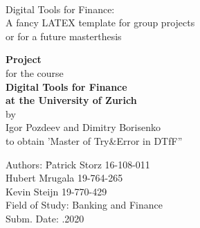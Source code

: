 \documentclass[12pt,a4paper]{article}
\begin{document}
\thispagestyle{empty}
\ \vspace{1.0cm}
\begin{center}
{\LARGE
Digital Tools for Finance: \\[0.1cm]
A fancy LATEX template for group projects\\[0.1cm]
or for a future masterthesis \\[1cm]
}

{
{\bf Project} \\
for the course \\[0.5cm]
{\bf Digital Tools for Finance } \\
{\bf at the University of Zurich} \\[0.5cm]
by\\
Igor Pozdeev and Dimitry Borisenko\\
to obtain 'Master of Try\&Error in DTfF'' \\[2.5cm]
}


\hspace{1cm}\begin{minipage}[h]{12cm}
\begin{tabbing}
Authors: \hspace{1cm} \= Patrick Storz 16-108-011 \\
\> Hubert Mrugala 19-764-265 \\
\> Kevin Steijn 19-770-429 \\
Field of Study: \> Banking and Finance \\
Subm. Date: .2020 \\
\end{tabbing}
\end{minipage}
\end{center}
\newpage


\begin{abstract}
Flash Eurozone PMIs for September and their signal with respect to the business cycle.
Purchasing Managers Index (PMI) is a survey that measures firms' business activity.
The surveys ask respondents (managers) to report the change in each variable (like output or employment) compared to the prior month, noting whether each has risen/improved, fallen/deteriorated or remained unchanged.Flash reading is an advanced estimate of the final PMI number based on ~85\% of total responses. It's publised about a week earlier
If PMI is 50 then nothing changed with respect to the last month. More than 50 - increased business activity. Less than 50 - decreased activity.
In addition,PMIs can be used to forecast GDP.

\end{abstract}
\newpage
\end{document}
